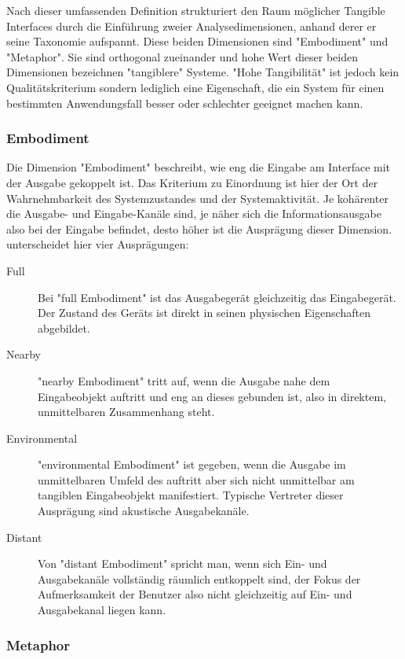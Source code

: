 Nach dieser umfassenden Definition strukturiert \citeauthor{Fishkin04} den Raum möglicher Tangible Interfaces durch die Einführung zweier Analysedimensionen, anhand derer er seine  Taxonomie aufspannt. Diese beiden Dimensionen sind "Embodiment" und "Metaphor". Sie sind orthogonal zueinander und hohe Wert dieser beiden Dimensionen bezeichnen "tangiblere" Systeme. "Hohe Tangibilität" ist jedoch kein Qualitätskriterium sondern lediglich eine Eigenschaft, die ein System für einen bestimmten Anwendungsfall besser oder schlechter geeignet machen kann.

\subsubsection{Embodiment}
Die Dimension "Embodiment" beschreibt, wie eng die Eingabe am Interface mit der Ausgabe gekoppelt ist. Das Kriterium zu Einordnung ist hier der Ort der Wahrnehmbarkeit des Systemzustandes und der Systemaktivität. Je kohärenter die Ausgabe- und Eingabe-Kanäle sind, je näher sich die Informationsausgabe also bei der Eingabe befindet, desto höher ist die Ausprägung dieser Dimension. \citeauthor{Fishkin04} unterscheidet hier vier Ausprägungen:
\begin{description}
 \item[Full] Bei "full Embodiment" ist das Ausgabegerät gleichzeitig das Eingabegerät. Der Zustand des Geräts ist direkt in seinen physischen Eigenschaften abgebildet.
 \item[Nearby] "nearby Embodiment" tritt auf, wenn die Ausgabe nahe dem Eingabeobjekt auftritt und eng an dieses gebunden ist, also in direktem, unmittelbaren Zusammenhang steht. 
 \item[Environmental] "environmental Embodiment" ist gegeben, wenn die Ausgabe im unmittelbaren Umfeld des auftritt aber sich nicht unmittelbar am tangiblen Eingabeobjekt manifestiert. Typische Vertreter dieser Ausprägung sind akustische Ausgabekanäle.
 \item[Distant] Von "distant Embodiment" spricht man, wenn sich Ein- und Ausgabekanäle vollständig räumlich entkoppelt sind, der Fokus der Aufmerksamkeit der Benutzer also nicht gleichzeitig auf Ein- und Ausgabekanal liegen kann. 
\end{description}

\subsubsection{Metaphor}

